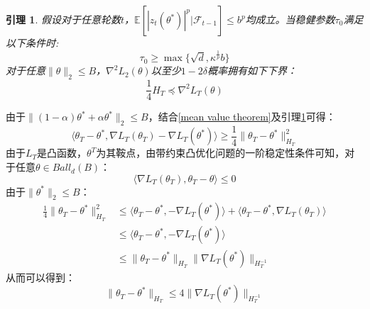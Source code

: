 \documentclass[UTF8,a4paper,10.5pt]{ctexart}
\newcommand{\Fcal}{\mathcal F}
\newcommand{\E}{\mathbb{E}}
\newtheorem{lemma}[theorem]{引理}
\begin{document}
\begin{lemma}
	假设对于任意轮数$t$，$\E[|z_t(\theta^*)|^p|\Fcal_{t-1}]\leq b^p$均成立。当稳健参数$\tau_0$满足以下条件时:
	\begin{equation*}
		\tau_0 \geq \max\{\sqrt{d}, \kappa^{\frac{1}{p}}b\}
	\end{equation*}
	对于任意$\|\theta\|_2 \leq B$，$\nabla^2L_2(\theta)$以至少$1-2\delta$概率拥有如下下界：
	\begin{equation*}
		\frac{1}{4}H_T \preceq \nabla^2L_T(\theta)	
	\end{equation*}
	\label{second order}
\end{lemma}
由于$\|(1-\alpha)\theta^* + \alpha\theta^*\|_2\leq B$，结合\ref{mean value theorem}及引理\ref{second order}可得：
\begin{equation*}
	\langle \theta_T - \theta^*,\nabla L_T(\theta_T) - \nabla L_T(\theta^*)\rangle \geq \frac{1}{4}\|\theta_T - \theta^*\|_{H_T}^2
\end{equation*}
由于$L_T$是凸函数，$\theta^T$为其鞍点，由带约束凸优化问题的一阶稳定性条件可知，对于任意$\theta\in Ball_d(B)$：
\begin{equation*}
	\langle\nabla L_T(\theta_T), \theta_T-\theta\rangle\leq 0
\end{equation*}
由于$\|\theta^*\|_2\leq B$：
\begin{align*}
	\frac{1}{4}\|\theta_T - \theta^*\|_{H_T}^2 &\leq \langle \theta_T - \theta^*, - \nabla L_T(\theta^*)\rangle + \langle \theta_T-\theta^*,\nabla L_T(\theta_T)\rangle\\
	&\leq \langle \theta_T - \theta^*, - \nabla L_T(\theta^*)\rangle \\
	&\leq\|\theta_T - \theta^*\|_{H_T}\|\nabla L_T(\theta^*)\|_{H_T^{-1}}
\end{align*}
从而可以得到：
\begin{equation}
	\|\theta_T - \theta^*\|_{H_T} \leq 4\|\nabla L_T(\theta^*)\|_{H_T^{-1}}
\end{equation}
\end{document}
